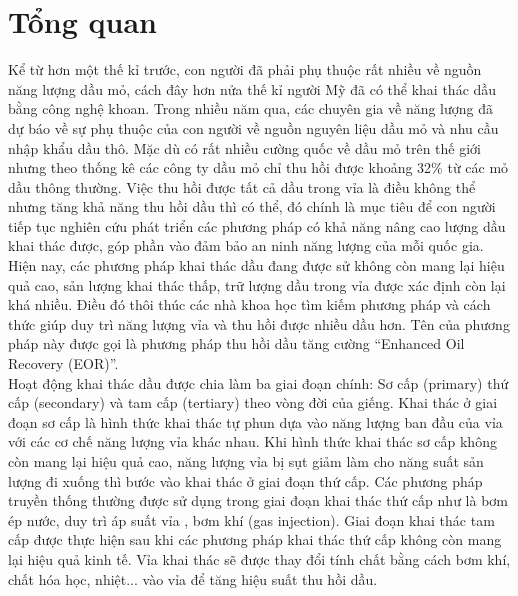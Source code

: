 \documentclass[12pt,a4paper]{article}
\begin{document}
\clearpage
{}
\newpage

\tableofcontents
\newpage

\listoftables
{}
\newpage

\listoffigures
{}
\newpage

\section{Tổng quan}
Kể từ hơn một thế kỉ trước, con người đã phải phụ thuộc rất nhiều về nguồn năng lượng dầu mỏ, cách đây hơn nửa thế kỉ người Mỹ đã có thể khai thác dầu bằng công nghệ khoan. Trong nhiều năm qua, các chuyên gia về năng lượng đã dự báo về sự phụ thuộc của con người về nguồn nguyên liệu dầu mỏ và nhu cầu nhập khẩu dầu thô. Mặc dù có rất nhiều cường quốc về dầu mỏ trên thế giới nhưng theo thống kê các công ty dầu mỏ chỉ thu hồi được khoảng 32\% từ các mỏ dầu thông thường. Việc thu hồi được tất cả dầu trong vỉa là điều không thể nhưng tăng khả năng thu hồi dầu thì có thể, đó chính là mục tiêu để con người tiếp tục nghiên cứu phát triển các phương pháp có khả năng nâng cao lượng dầu khai thác được, góp phần vào đảm bảo an ninh năng lượng của mỗi quốc gia.\\
Hiện nay, các phương pháp khai thác dầu đang được sử không còn mang lại hiệu quả cao, sản lượng khai thác thấp, trữ lượng dầu trong vỉa được xác định còn lại khá nhiều. Điều đó thôi thúc các nhà khoa học tìm kiếm phương pháp và cách thức giúp duy trì năng lượng vỉa và thu hồi được nhiều dầu hơn. Tên của phương pháp này được gọi là phương pháp thu hồi dầu tăng cường “Enhanced Oil Recovery (EOR)”.\\
Hoạt động khai thác dầu được chia làm ba giai đoạn chính: Sơ cấp (primary) thứ cấp (secondary) và tam cấp (tertiary) \cite{green1998enhanced} theo vòng đời của giếng. Khai thác ở giai đoạn sơ cấp là hình thức khai thác tự phun dựa vào năng lượng ban đầu của vỉa với các cơ chế năng lượng vỉa khác nhau. Khi hình thức khai thác sơ cấp không còn mang lại hiệu quả cao, năng lượng vỉa bị sụt giảm làm cho năng suất sản lượng đi xuống thì bước vào khai thác ở giai đoạn thứ cấp. Các phương pháp truyền thống thường được sử dụng trong giai đoạn khai thác thứ cấp như là bơm ép nước, duy trì áp suất vỉa , bơm khí (gas injection). Giai đoạn khai thác tam cấp được thực hiện sau khi các phương pháp khai thác thứ cấp không còn mang lại hiệu quả kinh tế. Vỉa khai thác sẽ được thay đổi tính chất bằng cách bơm khí, chất hóa học, nhiệt... vào vỉa để tăng hiệu suất thu hồi dầu.\\
\end{document}
